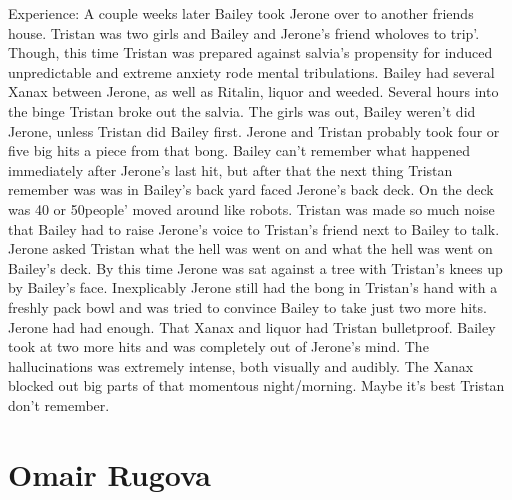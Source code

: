 \documentclass[12pt]{book}
\begin{document}
Experience: A couple weeks later Bailey took Jerone over to another friends house. Tristan was two girls and Bailey and Jerone's friend wholoves to trip'. Though, this time Tristan was prepared against salvia's propensity for induced unpredictable and extreme anxiety rode mental tribulations. Bailey had several Xanax between Jerone, as well as Ritalin, liquor and weeded. Several hours into the binge Tristan broke out the salvia. The girls was out, Bailey weren't did Jerone, unless Tristan did Bailey first. Jerone and Tristan probably took four or five big hits a piece from that bong. Bailey can't remember what happened immediately after Jerone's last hit, but after that the next thing Tristan remember was was in Bailey's back yard faced Jerone's back deck. On the deck was 40 or 50people' moved around like robots. Tristan was made so much noise that Bailey had to raise Jerone's voice to Tristan's friend next to Bailey to talk. Jerone asked Tristan what the hell was went on and what the hell was went on Bailey's deck. By this time Jerone was sat against a tree with Tristan's knees up by Bailey's face. Inexplicably Jerone still had the bong in Tristan's hand with a freshly pack bowl and was tried to convince Bailey to take just two more hits. Jerone had had enough. That Xanax and liquor had Tristan bulletproof. Bailey took at two more hits and was completely out of Jerone's mind. The hallucinations was extremely intense, both visually and audibly. The Xanax blocked out big parts of that momentous night/morning. Maybe it's best Tristan don't remember.



\chapter{Omair Rugova}
\end{document}
